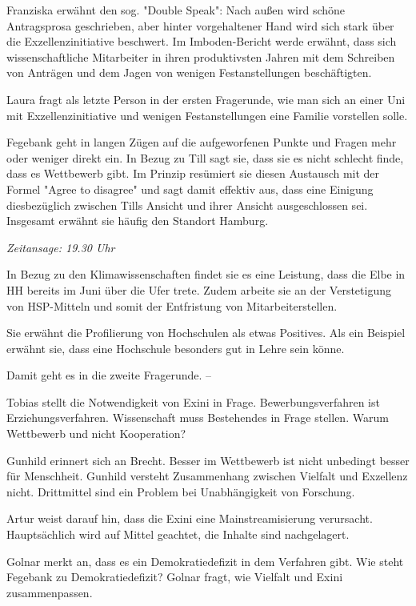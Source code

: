 \documentclass[ngerman,headheight=70pt]{scrartcl}
\begin{document}
    Franziska erwähnt den sog. "Double Speak": Nach außen wird schöne Antragsprosa
    geschrieben, aber hinter vorgehaltener Hand wird sich stark über die
    Exzellenzinitiative beschwert. Im Imboden-Bericht werde erwähnt, dass
    sich wissenschaftliche Mitarbeiter in ihren produktivsten Jahren mit
    dem Schreiben von Anträgen und dem Jagen von wenigen Festanstellungen
    beschäftigten.

    Laura fragt als letzte Person in der ersten Fragerunde, wie man sich an einer
    Uni mit Exzellenzinitiative und wenigen Festanstellungen eine Familie vorstellen
    solle.

    Fegebank geht in langen Zügen auf die aufgeworfenen Punkte und Fragen
    mehr oder weniger direkt ein. In Bezug zu Till sagt sie, dass sie es nicht
    schlecht finde, dass es Wettbewerb gibt. Im Prinzip resümiert sie diesen
    Austausch mit der Formel "Agree to disagree" und sagt damit effektiv aus,
    dass eine Einigung diesbezüglich zwischen Tills Ansicht und ihrer Ansicht
    ausgeschlossen sei. Insgesamt erwähnt sie häufig den Standort Hamburg.

    \textit{Zeitansage: 19.30 Uhr}

    In Bezug zu den Klimawissenschaften findet sie es eine Leistung, dass
    die Elbe in HH bereits im Juni über die Ufer trete.
    Zudem arbeite sie an der Verstetigung von HSP-Mitteln und somit der
    Entfristung von Mitarbeiterstellen.

    Sie erwähnt die Profilierung von Hochschulen als etwas Positives. Als ein
    Beispiel erwähnt sie, dass eine Hochschule besonders gut in Lehre sein könne.

    Damit geht es in die zweite Fragerunde.
    --

    Tobias stellt die Notwendigkeit von Exini in Frage. Bewerbungsverfahren
    ist Erziehungsverfahren. Wissenschaft muss Bestehendes in Frage stellen.
    Warum Wettbewerb und nicht Kooperation?

    Gunhild erinnert sich an Brecht. Besser im Wettbewerb ist nicht unbedingt
    besser für Menschheit. Gunhild versteht Zusammenhang zwischen Vielfalt
    und Exzellenz nicht. Drittmittel sind ein Problem bei Unabhängigkeit von
    Forschung.

    Artur weist darauf hin, dass die Exini eine Mainstreamisierung verursacht.
    Hauptsächlich wird auf Mittel geachtet, die Inhalte sind nachgelagert.

    Golnar merkt an, dass es ein Demokratiedefizit in dem Verfahren gibt.
    Wie steht Fegebank zu Demokratiedefizit? Golnar fragt, wie Vielfalt und
    Exini zusammenpassen.
\end{document}
